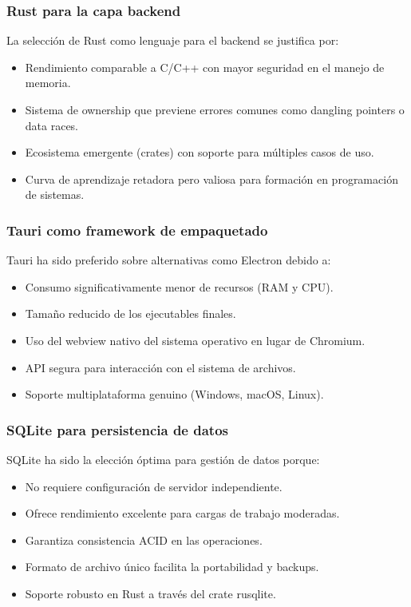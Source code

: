 \documentclass[11pt, a4paper]{article}
\begin{document}
  \subsubsection{Rust para la capa backend}
  La selección de Rust como lenguaje para el backend se justifica por:
  \begin{itemize}
      \item Rendimiento comparable a C/C++ con mayor seguridad en el manejo de memoria.
      \item Sistema de ownership que previene errores comunes como dangling pointers o data races.
      \item Ecosistema emergente (crates) con soporte para múltiples casos de uso.
      \item Curva de aprendizaje retadora pero valiosa para formación en programación de sistemas.
  \end{itemize}

  \subsubsection{Tauri como framework de empaquetado}
  Tauri ha sido preferido sobre alternativas como Electron debido a:
  \begin{itemize}
      \item Consumo significativamente menor de recursos (RAM y CPU).
      \item Tamaño reducido de los ejecutables finales.
      \item Uso del webview nativo del sistema operativo en lugar de Chromium.
      \item API segura para interacción con el sistema de archivos.
      \item Soporte multiplataforma genuino (Windows, macOS, Linux).
  \end{itemize}

  \subsubsection{SQLite para persistencia de datos}
  SQLite ha sido la elección óptima para gestión de datos porque:
  \begin{itemize}
      \item No requiere configuración de servidor independiente.
      \item Ofrece rendimiento excelente para cargas de trabajo moderadas.
      \item Garantiza consistencia ACID en las operaciones.
      \item Formato de archivo único facilita la portabilidad y backups.
      \item Soporte robusto en Rust a través del crate rusqlite.
  \end{itemize}
\end{document}
